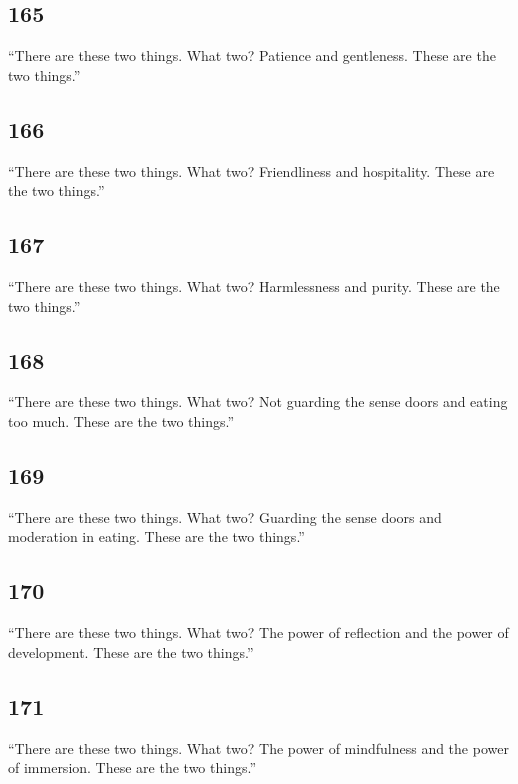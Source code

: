 \documentclass[12pt,openany]{book}%
\begin{document}
\subsection*{165 }

“There are these two things. What two? Patience and gentleness. These are the two things.” 

\subsection*{166 }

“There are these two things. What two? Friendliness and hospitality. These are the two things.” 

\subsection*{167 }

“There are these two things. What two? Harmlessness and purity. These are the two things.” 

\subsection*{168 }

“There are these two things. What two? Not guarding the sense doors and eating too much. These are the two things.” 

\subsection*{169 }

“There are these two things. What two? Guarding the sense doors and moderation in eating. These are the two things.” 

\subsection*{170 }

“There are these two things. What two? The power of reflection and the power of development. These are the two things.” 

\subsection*{171 }

“There are these two things. What two? The power of mindfulness and the power of immersion. These are the two things.” 
\end{document}
